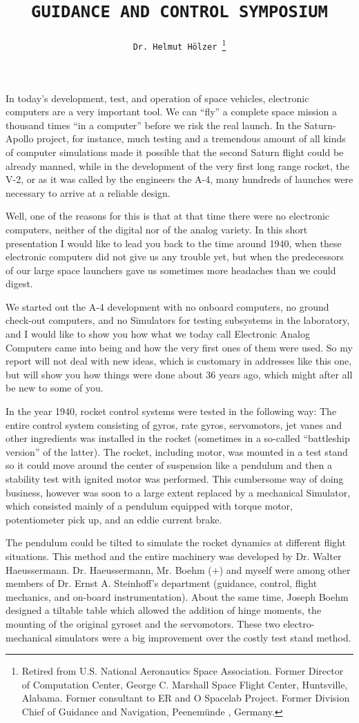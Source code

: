 \documentclass[11pt, a4paper]{article}
\title{\texttt{GUIDANCE AND CONTROL SYMPOSIUM}}
\author{\texttt{Dr. Helmut Hölzer }\footnote{Retired from U.S. National Aeronautics Space Association. Former Director of Computation Center, George C. Marshall Space Flight Center, Huntsville, Alabama. Former consultant to ER and O Spacelab Project. Former Division Chief of Guidance and Navigation, Peenemünde , Germany.}}
\date{}
\begin{document}
\maketitle

In today's development, test, and operation of space vehicles, electronic computers are a very important tool. We can ``fly'' a complete space mission a thousand times ``in a computer'' before we risk the real launch. In the Saturn-Apollo project, for instance, much testing and a tremendous amount of all kinds of computer simulations made it possible that the second Saturn flight could be already manned, while in the development of the very first long range rocket, the V-2, or as it was called by the engineers the A-4, many hundreds of launches were necessary to arrive at a reliable design.

Well, one of the reasons for this is that at that time there were no electronic computers, neither of the digital nor of the analog variety. In this short presentation I would like to lead you back to the time around 1940, when these electronic computers did not give us any trouble yet, but when the predecessors of our large space launchers gave us sometimes more headaches than we could digest.

We started out the A-4 development with no onboard computers, no ground check-out computers, and no Simulators for testing subsystems in the laboratory, and I would like to show you how what we today call Electronic Analog Computers came into being and how the very first ones of them were used. So my report will not deal with new ideas, which is customary in addresses like this one, but will show you how things were done about 36 years ago, which might after all be new to some of you.

In the year 1940, rocket control systems were tested in the following way: The entire control system consisting of gyros, rate gyros, servomotors, jet vanes and other ingredients was installed in the rocket (sometimes in a so-called ``battleship version'' of the latter). The rocket, including motor, was mounted in a test stand so it could move around the center of suspension like a pendulum and then a stability test with ignited motor was performed. This cumbersome way of doing business, however was soon to a large extent replaced by a mechanical Simulator, which consisted mainly of a pendulum equipped with torque motor, potentiometer pick up, and an eddie current brake.

The pendulum could be tilted to simulate the rocket dynamics at different flight situations. This method and the entire machinery was developed by Dr. Walter Haeussermann. Dr. Haeussermann, Mr. Boehm ($+$) and myself were among other members of Dr. Ernst A. Steinhoff's department (guidance, control, flight mechanics, and on-board instrumentation). About the same time, Joseph Boehm designed a tiltable table which allowed the addition of hinge moments, the mounting of the original gyroset and the servomotors. These two electro-mechanical simulators were a big improvement over the costly test stand method.
\end{document}
